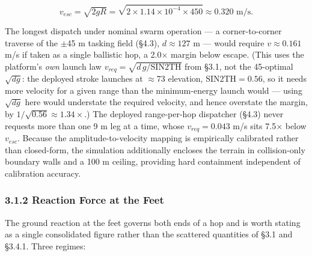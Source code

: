 \documentclass[conference]{IEEEtran}
\begin{document}
\begin{equation*}v_{esc} = \sqrt{2gR} = \sqrt{2 \times 1.14\times10^{-4} \times 450} \approx 0.320 \text{ m/s}.\end{equation*}

The longest dispatch under nominal swarm operation --- a corner-to-corner traverse of the \ensuremath{\pm}45 m tasking field (\S4.3), $d \approx 127$ m --- would require $v \approx 0.161$ m/s if taken as a single ballistic hop, a 2.0\ensuremath{\times} margin below escape. (This uses the platform's \emph{own} launch law $v_{req} = \sqrt{d\,g/\mathrm{SIN2TH}}$ from \S3.1, not the 45\textdegree{}-optimal $\sqrt{dg}$: the deployed stroke launches at $\approx$73\textdegree{} elevation, $\mathrm{SIN2TH} = 0.56$, so it needs more velocity for a given range than the minimum-energy launch would --- using $\sqrt{dg}$ here would understate the required velocity, and hence overstate the margin, by $1/\sqrt{0.56} \approx 1.34\times$.) The deployed range-per-hop dispatcher (\S4.3) never requests more than one 9 m leg at a time, whose $v_{req} = 0.043$ m/s sits 7.5\ensuremath{\times} below $v_{esc}$. Because the amplitude-to-velocity mapping is empirically calibrated rather than closed-form, the simulation additionally encloses the terrain in collision-only boundary walls and a 100 m ceiling, providing hard containment independent of calibration accuracy.

\subsubsection*{3.1.2 Reaction Force at the Feet}

The ground reaction at the feet governs both ends of a hop and is worth stating as a single consolidated figure rather than the scattered quantities of \S3.1 and \S3.4.1. Three regimes:
\end{document}
